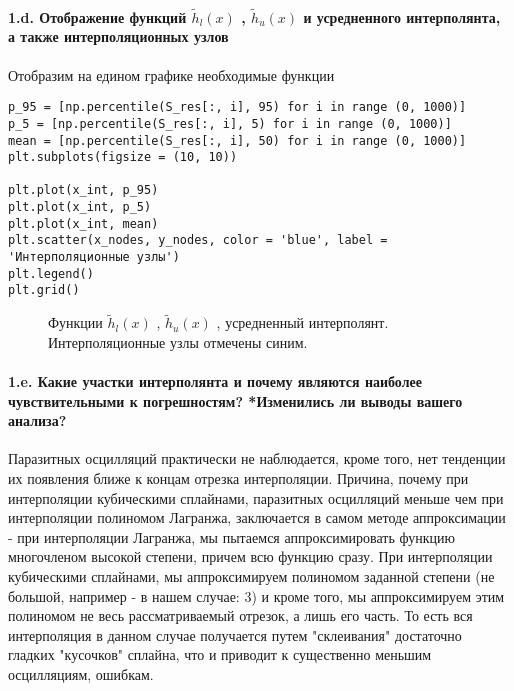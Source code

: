\paragraph{1.d. Отображение функций  $\tilde{h}_l(x)$ , $\tilde{h}_u(x)$ 
 и усредненного интерполянта, а также интерполяционных узлов\\ }
\begin{flushleft}
Отобразим на едином графике необходимые функции
\end{flushleft}
\begin{lstlisting}
p_95 = [np.percentile(S_res[:, i], 95) for i in range (0, 1000)]
p_5 = [np.percentile(S_res[:, i], 5) for i in range (0, 1000)]
mean = [np.percentile(S_res[:, i], 50) for i in range (0, 1000)]
plt.subplots(figsize = (10, 10))
 
plt.plot(x_int, p_95)
plt.plot(x_int, p_5)
plt.plot(x_int, mean)
plt.scatter(x_nodes, y_nodes, color = 'blue', label = 'Интерполяционные узлы')
plt.legend()
plt.grid()
\end{lstlisting}
\begin{figure}[h]
\caption{Функции $\tilde{h}_l(x)$ , $\tilde{h}_u(x)$ 
, усредненный интерполянт. Интерполяционные узлы отмечены синим.}
\end{figure}
\paragraph{1.e. Какие участки интерполянта и почему являются наиболее чувствительными к погрешностям? *Изменились ли выводы вашего анализа? \\}
\begin{flushleft}
Паразитных осцилляций практически не наблюдается, кроме того, нет тенденции их появления ближе к концам отрезка интерполяции. Причина, почему при интерполяции кубическими сплайнами, паразитных осцилляций меньше чем при интерполяции полиномом Лагранжа, заключается в самом методе аппроксимации - при интерполяции Лагранжа, мы пытаемся аппроксимировать функцию многочленом высокой степени, причем всю функцию сразу. При интерполяции кубическими сплайнами, мы аппроксимируем полиномом заданной степени (не большой, например - в нашем случае: 3) и кроме того, мы аппроксимируем этим полиномом не весь рассматриваемый отрезок, а лишь его часть. То есть вся интерполяция в данном случае получается путем "склеивания" достаточно гладких "кусочков" сплайна, что и приводит к существенно меньшим осцилляциям, ошибкам.
\end{flushleft}
